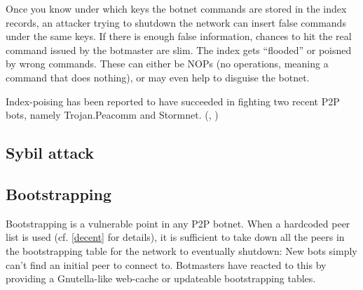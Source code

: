 \documentclass{llncs}
\begin{document}
Once you know under which keys the botnet commands are stored in the
index records, an attacker trying to shutdown the network can insert
false commands under the same keys. If there is enough false
information, chances to hit the real command issued by the botmaster
are slim. The index gets ``flooded'' or poisned by wrong
commands. These can either be NOPs (no operations, meaning a command
that does nothing), or may even help to disguise the botnet.

Index-poising has been reported to have succeeded
in fighting two recent P2P bots, namely Trojan.Peacomm and
Stormnet. (\cite{grizzard2007peer}, \cite{liang2006index})


\subsection{Sybil attack}

\subsection{Bootstrapping}
Bootstrapping is a vulnerable point in any P2P botnet. When a
hardcoded peer list is used (cf. \ref{decent} for details), it is
sufficient to take down all the peers in the bootstrapping table for
the network to eventually shutdown: New bots simply can't find an
initial peer to connect to. Botmasters have reacted to this by
providing a Gnutella-like web-cache or updateable bootstrapping
tables.



\end{document}
